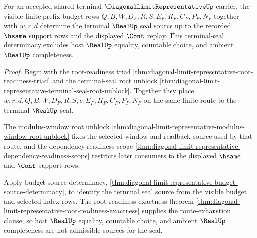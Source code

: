 \begin{theorem}
\label{thm:diagonal-limit-representative-terminal-seal-determinacy}
For an accepted shared-terminal $\DiagonalLimitRepresentativeUp$ carrier, the visible finite-prefix budget rows $Q,B,W,D_F,R,S,E_F,H_F,C_F,P_F,N_F$ together with $w,r,d$ determine the terminal $\RealUp$ seal source up to the recorded $\hsame$ support rows and the displayed $\Cont$ replay. This terminal-seal determinacy excludes host $\RealUp$ equality, countable choice, and ambient $\RealUp$ completeness.
\end{theorem}
\begin{proof}
Begin with the root-readiness triad \autoref{thm:diagonal-limit-representative-root-readiness-triad} and the terminal-seal root unblock \autoref{thm:diagonal-limit-representative-terminal-seal-root-unblock}. Together they place $w,r,d,Q,B,W,D_F,R,S,e,E_F,H_F,C_F,P_F,N_F$ on the same finite route to the terminal $\RealUp$ seal.

The modulus-window root unblock \autoref{thm:diagonal-limit-representative-modulus-window-root-unblock} fixes the selected window and readback source used by that route, and the dependency-readiness scope \autoref{thm:diagonal-limit-representative-dependency-readiness-scope} restricts later consumers to the displayed $\hsame$ and $\Cont$ support rows.

Apply budget-source determinacy, \autoref{thm:diagonal-limit-representative-budget-source-determinacy}, to identify the terminal seal source from the visible budget and selected-index rows. The root-readiness exactness theorem \autoref{thm:diagonal-limit-representative-root-readiness-exactness} supplies the route-exhaustion clause, so host $\RealUp$ equality, countable choice, and ambient $\RealUp$ completeness are not admissible sources for the seal.
\end{proof}

